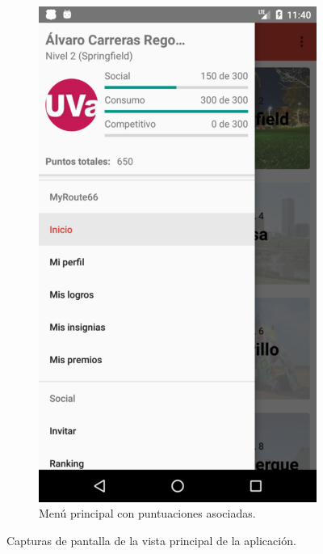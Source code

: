 \documentclass[twoside]{report}
\begin{document}
\begin{figure}[H]
\begin{center}
\begin{subfigure}[t]{.3\linewidth}
		\includegraphics[scale=0.2]{images/userguide/3.png}
		\caption{Menú principal con puntuaciones asociadas.}
	\end{subfigure}
\caption{Capturas de pantalla de la vista principal de la aplicación.}
\end{center}
\end{figure}
\end{document}
